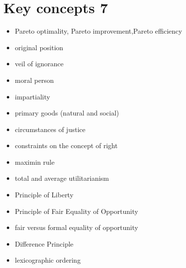 \section{Key concepts 7}
\begin{itemize}
	\item Pareto optimality, Pareto improvement,Pareto efficiency
	\item original position
	\item veil of ignorance
	\item moral person
	\item impartiality
	\item primary goods (natural and social)
	\item circumstances of justice
	\item constraints on the concept of right
	\item maximin rule
	\item total and average utilitarianism
	\item Principle of Liberty
	\item Principle of Fair Equality of Opportunity
	\item fair versus formal equality of opportunity
	\item Difference Principle
	\item lexicographic ordering
\end{itemize}
